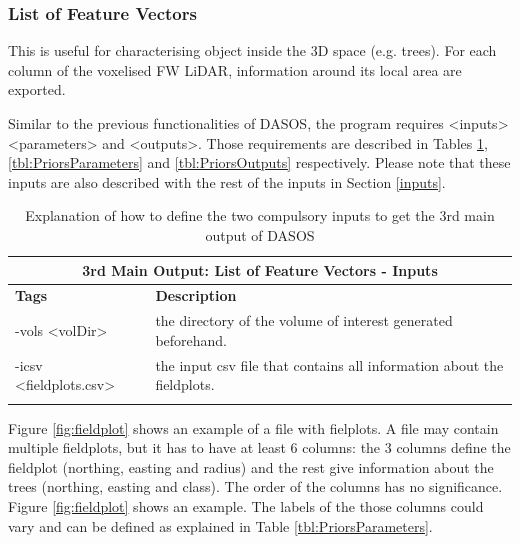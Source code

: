 \documentclass{subfiles}
\begin{document}
	 	\newpage
		\subsubsection{List of Feature Vectors}\label{3Dpriors}
		\par This is useful for characterising object inside the 3D space (e.g. trees). For each column of the voxelised FW LiDAR, information around its local area are exported. 
		
		
		\par Similar to the previous functionalities of DASOS, the program requires <inputs> <parameters> and <outputs>. Those requirements are described in Tables \ref{tbl:PriorsInputs}, \ref{tbl:PriorsParameters} and \ref{tbl:PriorsOutputs} respectively. Please note that these inputs are also described with the rest of the inputs in Section \ref{inputs}.
		
		
		\begin{longtable}
		 	{|p{3.1cm}|p{10.5cm}|}
						
			\toprule
			\multicolumn{2}{|c|}{\textbf{3rd Main Output: List of Feature Vectors - Inputs }} \\
			\midrule
		
			\textbf{Tags} & \textbf{Description} \\ 
			\cmidrule(r){1-1}\cmidrule(l){2-2}
			 -vols <volDir>  &  the directory of the volume of interest generated beforehand. 
			 \\
			\cmidrule(r){1-1}\cmidrule(l){2-2}
			 -icsv \newline <fieldplots.csv> & the input csv file that contains all information about the fieldplots. 
			    \\
			\bottomrule
			\caption[DASOS's functionalities]{Explanation of how to define the two compulsory inputs to get the 3rd main output of DASOS}
			\label{tbl:PriorsInputs}	
		\end{longtable}
		
		\par Figure \ref{fig:fieldplot} shows an example of a file with fielplots. A file may contain multiple fieldplots, but it has to have at least 6 columns: the 3 columns define the fieldplot (northing, easting and radius) and the rest give information about the trees (northing, easting and class). The order of the columns has no significance. Figure \ref{fig:fieldplot} shows an example. The labels of the those columns could vary and can be defined as explained in Table \ref{tbl:PriorsParameters}. 
		
\end{document}
